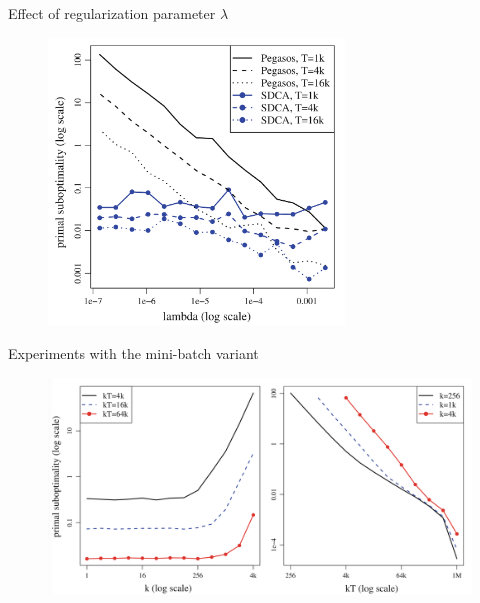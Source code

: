 \begin{frame}{Effect of regularization parameter $\lambda$}
    \begin{figure}[htbp]
        \centering
        \includegraphics[height=0.7\textheight, width=0.7\textwidth]{images/comp_T.png}
    \end{figure}
\end{frame}

\begin{frame}{Experiments with the mini-batch variant}
    \begin{figure}[htbp]
        \centering
        \includegraphics[height=0.7\textheight, width=\textwidth]{images/comp_nzh.png}
    \end{figure}
\end{frame}

